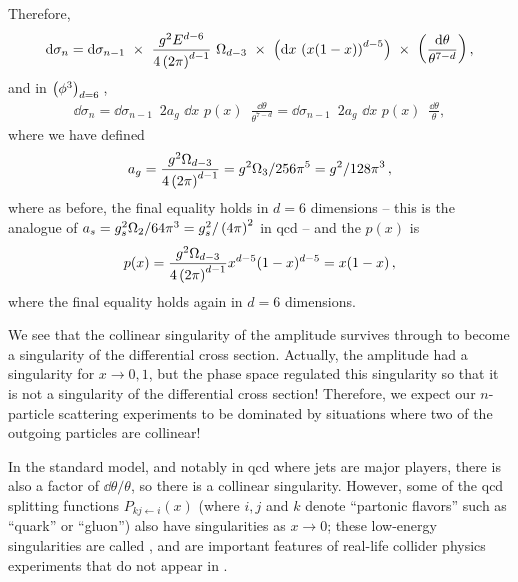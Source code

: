 Therefore,
\begin{align}
    \dd\sigma_n
    =
    \dd \sigma_{n-1}
    \,\,
    \times
    \,\,
    \frac{g^2 E^{d-6}}{4\left(2\pi\right)^{d-1}}
    \,\,
    \Omega_{d-3}
    \,\,
    \times
    \,\,
    \left(
        \dd x
        \,
        \left( x (1-x) \right)^{d-5}
    \right)
    \,\,
    \times
    \,\,
    \left(
        \frac{\dd\theta}{\theta^{7-d}}
    \right)
    ,
\end{align}
and in \(\left(\phi^3\right)_{d=6}{}\),
\begin{align}
    \dd\sigma_n
    =
    \dd \sigma_{n-1}
    \,\,\,
    2 a_g
    \,\,
    \dd x\,\, p(x)
    \,\,\,
    \frac{\dd \theta}{\theta^{7-d}}
    =
    \dd \sigma_{n-1}
    \,\,\,
    2 a_g
    \,\,
    \dd x\,\, p(x)
    \,\,\,
    \frac{\dd \theta}{\theta}
    ,
\end{align}
where we have defined
\begin{align}
    a_g
    =
    \frac{g^2\Omega_{d-3}}{4 \left(2 \pi\right)^{d-1}}
    =
    g^2 \Omega_3 / 256 \pi^5 = g^2 / 128 \pi^3
    \,,
\end{align}
where as before, the final equality holds in \(d=6\) dimensions -- this is the \phicubedsix{} analogue of \(a_s = g_s^2 \Omega_2 / 64 \pi^3 = g_s^2 / \left(4 \pi\right)^2\) in \gls{qcd} -- and the  \(p(x)\) is
%
\begin{align}
    p(x)
    =
    \frac{g^2\Omega_{d-3}}{4 \left(2 \pi\right)^{d-1}}
    x^{d-5}(1-x)^{d-5}
    =
    x(1-x)
    \,,
\end{align}
where the final equality holds again in \(d=6\) dimensions.

We see that the collinear singularity of the amplitude survives through to become a singularity of the differential cross section.
%
Actually, the amplitude had a singularity for \(x \to 0, 1\), but the phase space regulated this singularity so that it is not a singularity of the differential cross section!
%
Therefore, we expect our \(n\)-particle scattering experiments to be dominated by situations where two of the outgoing particles are collinear!

In the standard model, and notably in \gls{qcd} where jets are major players, there is also a factor of \(\dd\theta/\theta\), so there is a collinear singularity.
%
However, some of the \gls{qcd} splitting functions \(P_{kj\leftarrow i}(x)\) (where \(i, j\) and \(k\) denote ``partonic flavors'' such as ``quark'' or ``gluon'') also have singularities as \(x \to 0\);
%
these low-energy singularities are called , and are important features of real-life collider physics experiments that do not appear in \phicubedsix.


